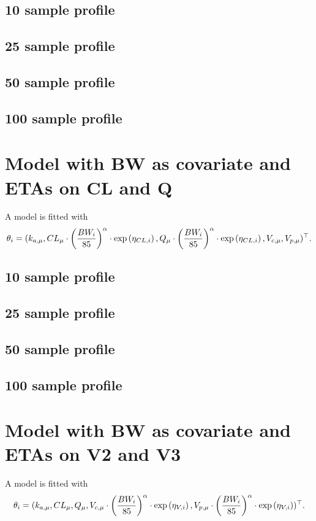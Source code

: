 \subsection{10 sample profile}

\subsection{25 sample profile}

\subsection{50 sample profile}

\subsection{100 sample profile}


\section{Model with BW as covariate and ETAs on CL and Q}
A model is fitted with $$\theta_i = (k_{a,\mu}, CL_{\mu}\cdot \left(\frac{BW_i}{85}\right)^\alpha \cdot \text{exp}\left({\eta_{CL,i}}\right), Q_{\mu}\cdot \left(\frac{BW_i}{85}\right)^\alpha \cdot\text{exp}\left({\eta_{CL,i}}\right),V_{c,\mu},V_{p,\mu})^\top.$$
\subsection{10 sample profile}

\subsection{25 sample profile}

\subsection{50 sample profile}

\subsection{100 sample profile}


\section{Model with BW as covariate and ETAs on V2 and V3}
A model is fitted with $$\theta_i = (k_{a,\mu}, CL_{\mu}, Q_{\mu},V_{c,\mu}\cdot\left(\frac{BW_i}{85}\right)^\alpha \cdot \text{exp}\left({\eta_{V,i}}\right),V_{p,\mu}\cdot\left(\frac{BW_i}{85}\right)^\alpha \cdot \text{exp}\left({\eta_{V,i}}\right))^\top.$$
